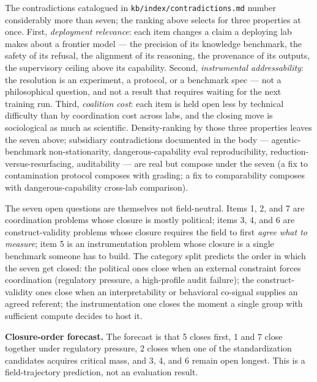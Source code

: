 The contradictions catalogued in
\texttt{kb/index/contradictions.md} number considerably more than
seven; the ranking above selects for three properties at once.
First, \emph{deployment relevance}: each item changes a claim a
deploying lab makes about a frontier model --- the precision of
its knowledge benchmark, the safety of its refusal, the alignment
of its reasoning, the provenance of its outputs, the supervisory
ceiling above its capability. Second, \emph{instrumental
addressability}: the resolution is an experiment, a protocol, or a
benchmark spec --- not a philosophical question, and not a result
that requires waiting for the next training run. Third,
\emph{coalition cost}: each item is held open less by technical
difficulty than by coordination cost across labs, and the closing
move is sociological as much as scientific. Density-ranking by
those three properties leaves the seven above; subsidiary
contradictions documented in the body --- agentic-benchmark
non-stationarity, dangerous-capability eval reproducibility,
 reduction-versus-resurfacing, 
auditability --- are real but compose under the seven (a fix to
contamination protocol composes with  grading; a fix
to  comparability composes with dangerous-capability cross-lab
comparison).

\begin{contradiction}
The seven open questions are themselves not field-neutral. Items
1, 2, and 7 are coordination problems whose closure is mostly
political; items 3, 4, and 6 are construct-validity problems whose
closure requires the field to first \emph{agree what to measure};
item 5 is an instrumentation problem whose closure is a single
benchmark someone has to build. The category split predicts the
order in which the seven get closed: the political ones close
when an external constraint forces coordination
(regulatory pressure, a high-profile audit failure); the
construct-validity ones close when an interpretability or
behavioral co-signal supplies an agreed referent; the
instrumentation one closes the moment a single group with
sufficient compute decides to host it.
\end{contradiction}

\begin{speculation}
\textbf{Closure-order forecast.} The forecast is
that 5 closes first, 1 and 7 close together under regulatory
pressure, 2 closes when one of the standardization candidates
acquires critical mass, and 3, 4, and 6 remain open longest. This
is a field-trajectory prediction, not an evaluation result.
\end{speculation}

